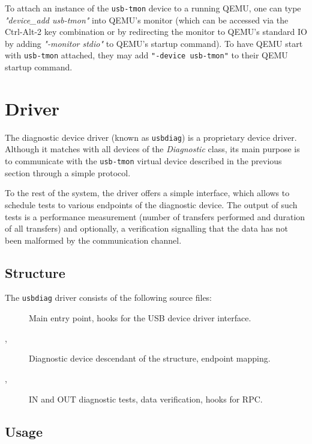 To attach an instance of the \texttt{usb-tmon} device to a running QEMU, one
can type \textit{"device\_add usb-tmon"} into QEMU's monitor (which can be
accessed via the Ctrl-Alt-2 key combination or by redirecting the
monitor to QEMU's standard IO by adding \textit{"-monitor stdio"} to QEMU's
startup command). To have QEMU start with \texttt{usb-tmon} attached, they may
add \texttt{"-device usb-tmon"} to their QEMU startup command.


\section{Driver}

The diagnostic device driver (known as \texttt{usbdiag}) is a proprietary device
driver. Although it matches with all devices of the \textit{Diagnostic} class,
its main purpose is to communicate with the \texttt{usb-tmon} virtual device
described in the previous section through a simple protocol.

To the rest of the system, the driver offers a simple interface, which allows to
schedule tests to various endpoints of the diagnostic device. The output of such
tests is a performance measurement (number of transfers performed and duration
of all transfers) and optionally, a verification signalling that the data has
not been malformed by the communication channel.


\subsection{Structure}

The \texttt{usbdiag} driver consists of the following source files:
%
\begin{description}
	\item[]
		Main entry point, hooks for the USB device driver interface.
	\item[,
		  ]
		Diagnostic device descendant of the  structure,
		endpoint mapping.
	\item[,
		  ]
		IN and OUT diagnostic tests, data verification, hooks for RPC.
\end{description}

\subsection{Usage}

